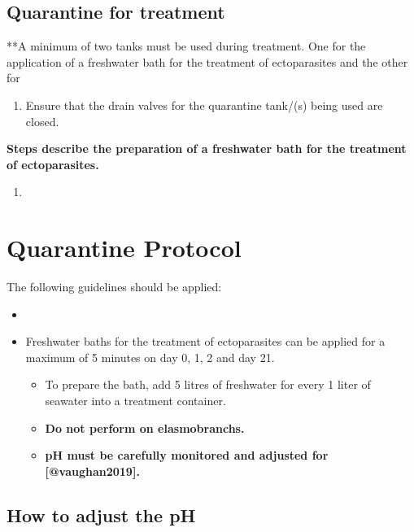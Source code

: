 \documentclass[
  12pt,
]{report}
\providecommand{\tightlist}{%
  \setlength{\itemsep}{0pt}\setlength{\parskip}{0pt}}\usepackage{longtable,booktabs,array}
\begin{document}
\hypertarget{sec-qt-treatment}{%
\subsection{Quarantine for treatment}\label{sec-qt-treatment}}

**A minimum of two tanks must be used during treatment. One for the
application of a freshwater bath for the treatment of ectoparasites and
the other for

\begin{enumerate}
\def\labelenumi{\arabic{enumi}.}
\tightlist
\item
  Ensure that the drain valves for the quarantine tank/(s) being used
  are closed.
\end{enumerate}

\textbf{Steps describe the preparation of a freshwater bath for the
treatment of ectoparasites.}

\begin{enumerate}
\def\labelenumi{\arabic{enumi}.}
\setcounter{enumi}{1}
\tightlist
\item
\end{enumerate}

\hypertarget{sec-q-protocol}{%
\section{Quarantine Protocol}\label{sec-q-protocol}}

The following guidelines should be applied:

\begin{itemize}
\tightlist
\item
\item
  Freshwater baths for the treatment of ectoparasites can be applied for
  a maximum of 5 minutes on day 0, 1, 2 and day 21.

  \begin{itemize}
  \tightlist
  \item
    To prepare the bath, add 5 litres of freshwater for every 1 liter of
    seawater into a treatment container.
  \item
    \textbf{Do not perform on elasmobranchs.}
  \item
    \textbf{pH must be carefully monitored and adjusted for
    {[}@vaughan2019{]}.}
  \end{itemize}
\end{itemize}

\hypertarget{how-to-adjust-the-ph}{%
\subsection{How to adjust the pH}\label{how-to-adjust-the-ph}}
\end{document}
